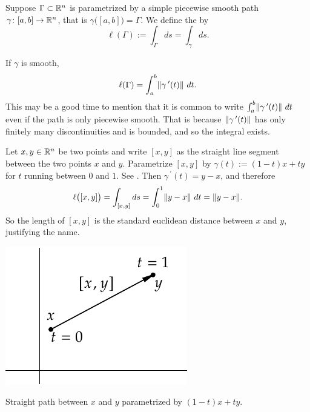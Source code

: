 \begin{defn}
Suppose $\Gamma \subset {\mathbb{R}}^n$ is parametrized by a simple
piecewise smooth path $\gamma \colon [a,b] \to {\mathbb{R}}^n$, that is
$\gamma\bigl( [a,b] \bigr) = \Gamma$.  We define the
\emph{} by
\begin{equation*}
\ell(\Gamma) := \int_{\Gamma} ds = \int_{\gamma} ds .
\end{equation*}
\end{defn}

If $\gamma$ is smooth,
\begin{equation*}
\ell(\Gamma) = 
\int_a^b
\lVert {\gamma^{\:\prime}(t)} \rVert~ dt .
\end{equation*}
This may be a good time to mention that it is common to write
$\int_a^b
\lVert {\gamma^{\:\prime}(t)} \rVert~ dt$ even if the path is only piecewise smooth.
That is because $\lVert {\gamma^{\:\prime}(t)} \rVert$ has only finitely many
discontinuities and is bounded, and so the integral exists.

\begin{example}
Let $x,y \in {\mathbb{R}}^n$ be two points and write $[x,y]$ as the straight line
segment between the two points $x$ and $y$.  Parametrize
$[x,y]$ by $\gamma(t) := (1-t)x + ty$ for $t$ running between $0$ and $1$.
See .
Then $\gamma^{\:\prime}(t) = y-x$, and therefore
\begin{equation*}
\ell\bigl([x,y]\bigr)
=
\int_{[x,y]} ds
=
\int_0^1 \lVert {y-x} \rVert ~ dt
=
\lVert {y-x} \rVert .
\end{equation*}
So the length of $[x,y]$ is the standard euclidean distance between $x$ and $y$,
justifying the name.
\begin{myfigureht}
\includegraphics{figures/straightpath}
\caption{Straight path between $x$ and $y$ parametrized
by $(1-t)x + ty$.\label{fig:straightpath}}
\end{myfigureht}
\end{example}

